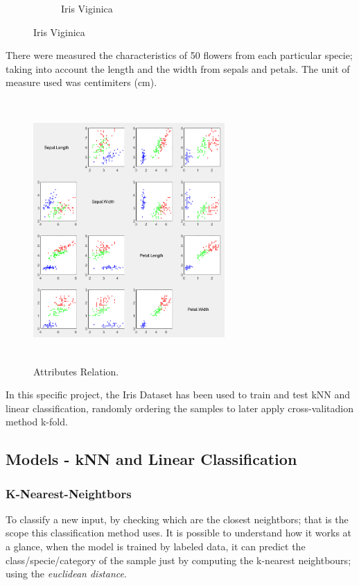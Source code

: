 \documentclass[11pt]{article}
\begin{document}
\begin{figure}[H]
\begin{subfigure}{0.32\textwidth}
  \caption{Iris Viginica}
 \end{subfigure}

\end{figure}

There were measured the characteristics of 50 flowers from each particular
specie; taking into account the length and the width from sepals and petals. The
unit of measure used was centimiters (cm).

\begin{figure}[h]
 \centering
 \includegraphics[width=0.65\textwidth, height=10cm]
                 {../images/characteristics.png}
 \caption{Attributes Relation.}
\end{figure}

In this specific project, the Iris Dataset has been used to train and test kNN
and linear classification, randomly ordering the samples to later apply
cross-valitadion method k-fold.

\subsection{Models - kNN and Linear Classification}

\subsubsection{K-Nearest-Neightbors}

To classify a new input, by checking which are the closest neightbors; that is
the scope this classification method uses. It is possible to understand how it
works at a glance, when the model is trained by labeled data, it can predict the
class/specie/category of the sample just by computing the k-nearest neightbours;
using the \textit{euclidean distance}.
\end{document}
